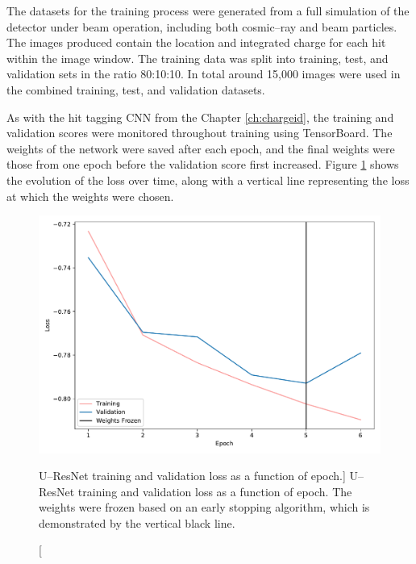The datasets for the training process were generated from a full simulation of
the \protodune{} detector under beam operation, including both cosmic--ray and
beam particles. The images produced contain the location and integrated charge
for each hit within the image window. The training data was split into training, 
test, and validation sets in the ratio 80:10:10. In total around 15,000 images 
were used in the combined training, test, and validation datasets.

As with the hit tagging CNN from the Chapter \ref{ch:chargeid}, the training and
validation scores were monitored throughout training using TensorBoard. The
weights of the network were saved after each epoch, and the final weights were
those from one epoch before the validation score first increased.  Figure 
\ref{fig:unet_loss} shows the evolution of the loss over time, along with a 
vertical line representing the loss at which the weights were chosen.
\begin{figure}
	\centering
	\includegraphics[width=\textwidth]{figures/unet_loss.pdf}
	\caption
	[U--ResNet training and validation loss as a function of epoch.]
	{U--ResNet training and validation loss as a function of epoch. The weights were
	frozen based on an early stopping algorithm, which is demonstrated by the
	vertical black line.}
	\label{fig:unet_loss}
\end{figure}

